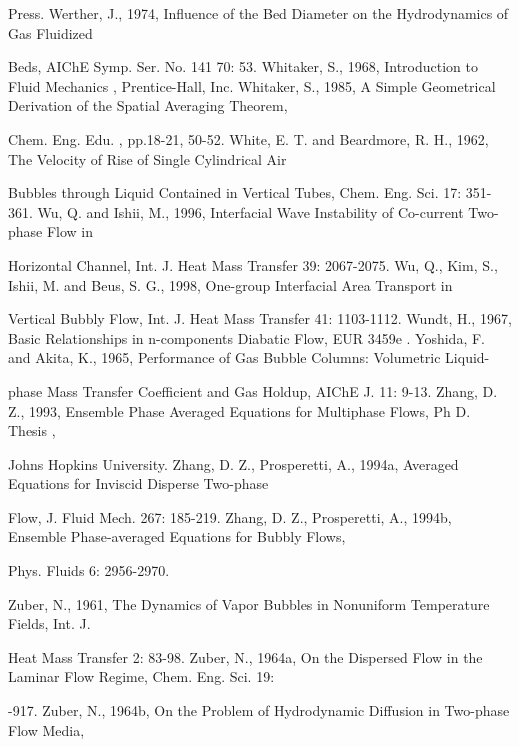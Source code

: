 \documentclass[11pt,a4paper,openany,fontset=none]{ctexbook}
\begin{document}
{\small\raggedright\noindent Press. Werther, J., 1974, Influence of the Bed Diameter on the Hydrodynamics of Gas Fluidized\par}
{\small\raggedright\noindent Beds, AIChE Symp. Ser. No. 141 70: 53. Whitaker, S., 1968, Introduction to Fluid Mechanics , Prentice-Hall, Inc. Whitaker, S., 1985, A Simple Geometrical Derivation of the Spatial Averaging Theorem,\par}
{\small\raggedright\noindent Chem. Eng. Edu. , pp.18-21, 50-52. White, E. T. and Beardmore, R. H., 1962, The Velocity of Rise of Single Cylindrical Air\par}
{\small\raggedright\noindent Bubbles through Liquid Contained in Vertical Tubes, Chem. Eng. Sci. 17: 351-361. Wu, Q. and Ishii, M., 1996, Interfacial Wave Instability of Co-current Two-phase Flow in\par}
{\small\raggedright\noindent Horizontal Channel, Int. J. Heat Mass Transfer 39: 2067-2075. Wu, Q., Kim, S., Ishii, M. and Beus, S. G., 1998, One-group Interfacial Area Transport in\par}
{\small\raggedright\noindent Vertical Bubbly Flow, Int. J. Heat Mass Transfer 41: 1103-1112. Wundt, H., 1967, Basic Relationships in n-components Diabatic Flow, EUR 3459e . Yoshida, F. and Akita, K., 1965, Performance of Gas Bubble Columns: Volumetric Liquid-\par}
{\small\raggedright\noindent phase Mass Transfer Coefficient and Gas Holdup, AIChE J. 11: 9-13. Zhang, D. Z., 1993, Ensemble Phase Averaged Equations for Multiphase Flows, Ph D. Thesis ,\par}
{\small\raggedright\noindent Johns Hopkins University. Zhang, D. Z., Prosperetti, A., 1994a, Averaged Equations for Inviscid Disperse Two-phase\par}
{\small\raggedright\noindent Flow, J. Fluid Mech. 267: 185-219. Zhang, D. Z., Prosperetti, A., 1994b, Ensemble Phase-averaged Equations for Bubbly Flows,\par}
{\small\raggedright\noindent Phys. Fluids 6: 2956-2970.\par}
{\small\raggedright\noindent Zuber, N., 1961, The Dynamics of Vapor Bubbles in Nonuniform Temperature Fields, Int. J.\par}
{\small\raggedright\noindent Heat Mass Transfer 2: 83-98. Zuber, N., 1964a, On the Dispersed Flow in the Laminar Flow Regime, Chem. Eng. Sci. 19:\par}
{\small\raggedright{}-917. Zuber, N., 1964b, On the Problem of Hydrodynamic Diffusion in Two-phase Flow Media,\par}
\end{document}

